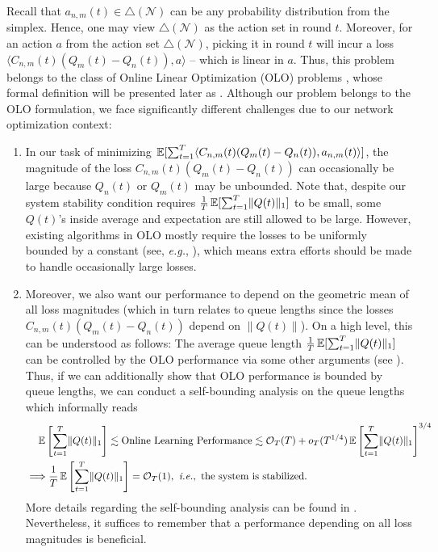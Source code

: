 \documentclass[11pt,fullpage,letterpaper]{article} %
\renewcommand{\bm}[1]{#1}%
\renewcommand{\O}{\operatorname{\mathcal O}}
\newcommand{\E}{\operatornamewithlimits{\mathbb{E}}}
\newcommand{\mN}{{\mathcal N}}
\begin{document}
Recall that $\bm a_{n,m}(t)\in \triangle(\mN)$ can be any probability distribution from the simplex. Hence, one may view $\triangle(\mN)$ as the action set in round $t$.
Moreover, for an action $\bm a$ from the action set $\triangle(\mN)$, picking it in round $t$ will incur a loss $\langle C_{n,m}(t) (\bm Q_m(t)-\bm Q_n(t)),\bm a\rangle$ -- which is linear in $\bm a$. Thus, this problem belongs to the class of Online Linear Optimization (OLO) problems \citep{zinkevich2003online,mcmahan2010adaptive,duchi2011adaptive}, whose formal definition will be presented later as .
Although our problem belongs to the OLO formulation, we face significantly different challenges due to our network optimization context:
\begin{enumerate}
\item[\textit{i)}] In our task of minimizing $\E[\sum_{t=1}^T \langle C_{n,m}(t) (\bm Q_m(t)-\bm Q_n(t)),\bm a_{n,m}(t)\rangle]$, the magnitude of the loss $C_{n,m}(t) (\bm Q_m(t) - \bm Q_n(t))$ can occasionally be large because $\bm Q_n(t)$ or $\bm Q_m(t)$ may be unbounded.
Note that, despite our system stability condition  requires $\frac 1T \E[\sum_{t=1}^T \lVert \bm Q(t)\rVert_1]$ to be small, some $\bm Q(t)$'s inside average and expectation are still allowed to be large.
However, existing algorithms in OLO mostly require the losses to be uniformly bounded by a constant (see, \textit{e.g.}, \citep{mcmahan2010adaptive,cutkosky2020parameter}), which means extra efforts should be made to handle occasionally large losses.
\item[\textit{ii)}] Moreover, we also want our performance to depend on the geometric mean of all loss magnitudes (which in turn relates to queue lengths since the losses $C_{n,m}(t) (\bm Q_m(t) - \bm Q_n(t))$ depend on $\lVert \bm Q(t)\rVert$). On a high level, this can be understood as follows: The average queue length $\frac 1T\E[\sum_{t=1}^T \lVert \bm Q(t)\rVert_1]$ can be controlled by the OLO performance via some other arguments (see ). Thus, if we can additionally show that OLO performance is bounded by queue lengths, we can conduct a self-bounding analysis on the queue lengths which informally reads
\begin{align}
&\quad \E\left [\sum_{t=1}^T \lVert \bm Q(t)\rVert_1\right ]\lesssim \text{Online Learning Performance} \lesssim \O_T(T) + o_T(T^{1/4}) \E\left [\sum_{t=1}^T \lVert \bm Q(t)\rVert_1\right ]^{3/4} \nonumber \\
&\Longrightarrow \frac 1T \E\left [\sum_{t=1}^T \lVert \bm Q(t)\rVert_1\right ] = \O_T(1),\textit{ i.e.},\text{ the system is stabilized}.\label{eq:self-bounding informal}
\end{align}
More details regarding the self-bounding analysis can be found in . Nevertheless, it suffices to remember that a performance depending on all loss magnitudes is beneficial.
\end{enumerate}
\end{document}
